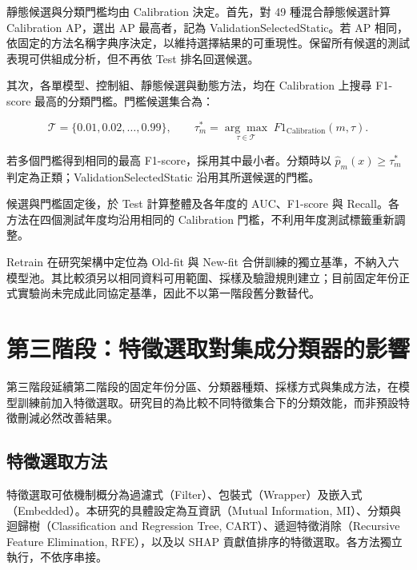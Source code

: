 靜態候選與分類門檻均由 Calibration 決定。首先，對 49 種混合靜態候選計算 Calibration AP，選出 AP 最高者，記為 ValidationSelectedStatic。若 AP 相同，依固定的方法名稱字典序決定，以維持選擇結果的可重現性。保留所有候選的測試表現可供組成分析，但不再依 Test 排名回選候選。

其次，各單模型、控制組、靜態候選與動態方法，均在 Calibration 上搜尋 F1-score 最高的分類門檻。門檻候選集合為：

\begin{equation}\label{eq:method-threshold}
\mathcal{T}=\{0.01,0.02,\ldots,0.99\},\qquad
\tau_m^*=\underset{\tau\in\mathcal{T}}{\arg\max}\;
F1_{\mathrm{Calibration}}(m,\tau).
\end{equation}

若多個門檻得到相同的最高 F1-score，採用其中最小者。分類時以 \(\hat p_m(x)\ge\tau_m^*\) 判定為正類；ValidationSelectedStatic 沿用其所選候選的門檻。

候選與門檻固定後，於 Test 計算整體及各年度的 AUC、F1-score 與 Recall。各方法在四個測試年度均沿用相同的 Calibration 門檻，不利用年度測試標籤重新調整。

Retrain 在研究架構中定位為 Old-fit 與 New-fit 合併訓練的獨立基準，不納入六模型池。其比較須另以相同資料可用範圍、採樣及驗證規則建立；目前固定年份正式實驗尚未完成此同協定基準，因此不以第一階段舊分數替代。

\section{第三階段：特徵選取對集成分類器的影響}\label{sec:method-phase3}

第三階段延續第二階段的固定年份分區、分類器種類、採樣方式與集成方法，在模型訓練前加入特徵選取。研究目的為比較不同特徵集合下的分類效能，而非預設特徵刪減必然改善結果。

\subsection{特徵選取方法}

特徵選取可依機制概分為過濾式（Filter）、包裝式（Wrapper）及嵌入式（Embedded）。本研究的具體設定為互資訊（Mutual Information, MI）、分類與迴歸樹（Classification and Regression Tree, CART）、遞迴特徵消除（Recursive Feature Elimination, RFE），以及以 SHAP 貢獻值排序的特徵選取。各方法獨立執行，不依序串接。

